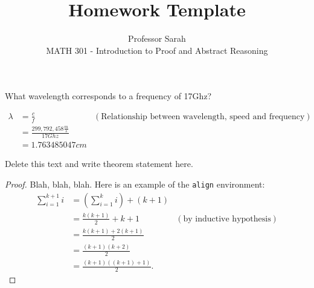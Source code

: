 \documentclass[12pt]{article}
\newenvironment{theorem}[2][Theorem]{\begin{trivlist}
    \item[\hskip \labelsep {\bfseries #1}\hskip \labelsep {\bfseries #2.}]}{\end{trivlist}}
\newenvironment{exercise}[2][Exercise]{\begin{trivlist}
    \item[\hskip \labelsep {\bfseries #1}\hskip \labelsep {\bfseries #2.}]}{\end{trivlist}}
\begin{document}
      
       
        
	\title{Homework Template}%
	\author{Professor Sarah\\ %
	MATH 301 - Introduction to Proof and Abstract Reasoning} %
	 
	 \maketitle
	  
      \begin{exercise}{1}
      What wavelength corresponds to a frequency of 17Ghz?
      
      \begin{align*}
      \lambda & = \frac{c}{f} & (\text{Relationship between wavelength, speed and frequency})\\
      & = \frac{299,792,458 \frac{m}{s}}{17 Ghz}\\
      & = 1.763485047 cm
      \end{align*}
      
      \end{exercise}
      
      
      
      
	  \begin{theorem}{x.yz} %
	  Delete this text and write theorem statement here.
	  \end{theorem}
	   
	   \begin{proof}
	   Blah, blah, blah.  Here is an example of the \texttt{align} environment:
	   \begin{align*}
	   \sum_{i=1}^{k+1}i & = \left(\sum_{i=1}^{k}i\right) +(k+1)\\ 
	   & = \frac{k(k+1)}{2}+k+1 & (\text{by inductive hypothesis})\\
	   & = \frac{k(k+1)+2(k+1)}{2}\\
	   & = \frac{(k+1)(k+2)}{2}\\
	   & = \frac{(k+1)((k+1)+1)}{2}.
	   \end{align*}
	   \end{proof}
	    
\end{document}
